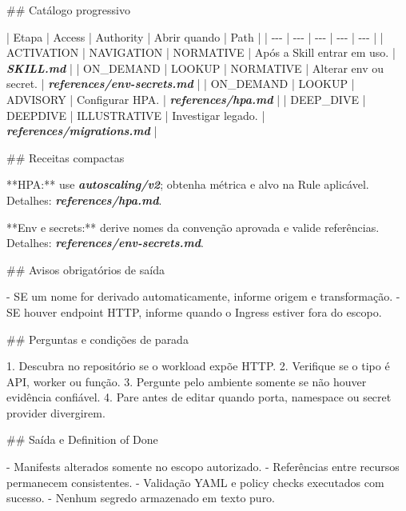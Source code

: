 \documentclass[
  10pt,
  a4paper,
  oneside]{book}
\newenvironment{Shaded}{}{}
\newcommand{\FunctionTok}[1]{\textcolor[rgb]{0.02,0.16,0.49}{#1}}
\newcommand{\InformationTok}[1]{\textcolor[rgb]{0.38,0.63,0.69}{\textbf{\textit{#1}}}}
\newcommand{\NormalTok}[1]{#1}
\newcommand{\SpecialStringTok}[1]{\textcolor[rgb]{0.73,0.40,0.53}{#1}}
\renewenvironment{Shaded}{\begin{snugshade}}{\end{snugshade}}%
\begin{document}
\begin{Shaded}
\begin{Highlighting}[]
\FunctionTok{\#\# Catálogo progressivo}

\NormalTok{| Etapa | Access | Authority | Abrir quando | Path |}
\NormalTok{| {-}{-}{-} | {-}{-}{-} | {-}{-}{-} | {-}{-}{-} | {-}{-}{-} |}
\NormalTok{| ACTIVATION | NAVIGATION | NORMATIVE | Após a Skill entrar em uso. | }\InformationTok{\textasciigrave{}SKILL.md\textasciigrave{}}\NormalTok{ |}
\NormalTok{| ON\_DEMAND | LOOKUP | NORMATIVE | Alterar env ou secret. | }\InformationTok{\textasciigrave{}references/env{-}secrets.md\textasciigrave{}}\NormalTok{ |}
\NormalTok{| ON\_DEMAND | LOOKUP | ADVISORY | Configurar HPA. | }\InformationTok{\textasciigrave{}references/hpa.md\textasciigrave{}}\NormalTok{ |}
\NormalTok{| DEEP\_DIVE | DEEPDIVE | ILLUSTRATIVE | Investigar legado. | }\InformationTok{\textasciigrave{}references/migrations.md\textasciigrave{}}\NormalTok{ |}

\FunctionTok{\#\# Receitas compactas}

\NormalTok{**HPA:** use }\InformationTok{\textasciigrave{}autoscaling/v2\textasciigrave{}}\NormalTok{; obtenha métrica e alvo na Rule aplicável.}
\NormalTok{Detalhes: }\InformationTok{\textasciigrave{}references/hpa.md\textasciigrave{}}\NormalTok{.}

\NormalTok{**Env e secrets:** derive nomes da convenção aprovada e valide referências.}
\NormalTok{Detalhes: }\InformationTok{\textasciigrave{}references/env{-}secrets.md\textasciigrave{}}\NormalTok{.}

\FunctionTok{\#\# Avisos obrigatórios de saída}

\SpecialStringTok{{-} }\NormalTok{SE um nome for derivado automaticamente, informe origem e transformação.}
\SpecialStringTok{{-} }\NormalTok{SE houver endpoint HTTP, informe quando o Ingress estiver fora do escopo.}

\FunctionTok{\#\# Perguntas e condições de parada}

\SpecialStringTok{1. }\NormalTok{Descubra no repositório se o workload expõe HTTP.}
\SpecialStringTok{2. }\NormalTok{Verifique se o tipo é API, worker ou função.}
\SpecialStringTok{3. }\NormalTok{Pergunte pelo ambiente somente se não houver evidência confiável.}
\SpecialStringTok{4. }\NormalTok{Pare antes de editar quando porta, namespace ou secret provider divergirem.}

\FunctionTok{\#\# Saída e Definition of Done}

\SpecialStringTok{{-} }\NormalTok{Manifests alterados somente no escopo autorizado.}
\SpecialStringTok{{-} }\NormalTok{Referências entre recursos permanecem consistentes.}
\SpecialStringTok{{-} }\NormalTok{Validação YAML e policy checks executados com sucesso.}
\SpecialStringTok{{-} }\NormalTok{Nenhum segredo armazenado em texto puro.}


\end{Highlighting}
\end{Shaded}
\end{document}
